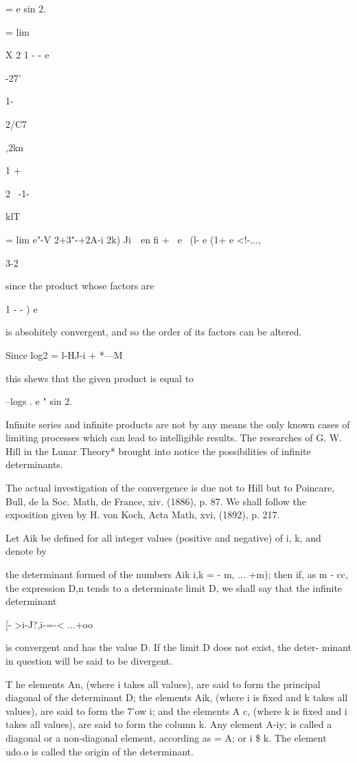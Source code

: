 = e sin 2.

= lim

X 2 1 - - e

 -27'

1-

2/C7

,2kn

1 +

2 \ -1-

klT

= lim e"-V 2+3"-+2A-i 2k) Ji\ \ en fi + \ e~ (l- e (1+ e <!-...,

3-2

%
%

since the product whose factors are

1 - - ) e

is absohitely convergent, and so the order of its factors can be
altered.

Since log2 = l-HJ-i + *---M

this shews that the given product is equal to

--logs . e " sin 2.


Infinite series and infinite products are not by any means the only
known cases of limiting processes which can lead to intelligible
results. The researches of G. W. Hill in the Lunar Theory* brought
into notice the possibilities of infinite determinants.

The actual investigation of the convergence is due not to Hill but to
Poincare, Bull, de la Soc. Math, de France, xiv. (1886), p. 87. We
shall follow the exposition given by H. von Koch, Acta Math, xvi,
(1892), p. 217.

Let Aik be defined for all integer values (positive and negative) of
i, k, and denote by

the determinant formed of the numbers Aik i,k = - m, ... +m); then if,
as m - cc, the expression D,n tends to a determinate limit D, we
shall say that the infinite determinant

[- >i-J?,i-=-< ...+oo

is convergent and has the value D. If the limit D does not exist, the
deter- minant in question will be said to be divergent.

T he elements An, (where i takes all values), are said to form the
principal diagonal of the determinant D; the elements Aik, (where i is
fixed and k takes all values), are said to form the 7'ow i; and the
elements A c, (where k is fixed and i takes all values), are said to
form the column k. Any element A-iy; is called a diagonal or a
non-diagonal element, according as = A; or i \$ k. The element udo.o
is called the origin of the determinant.

